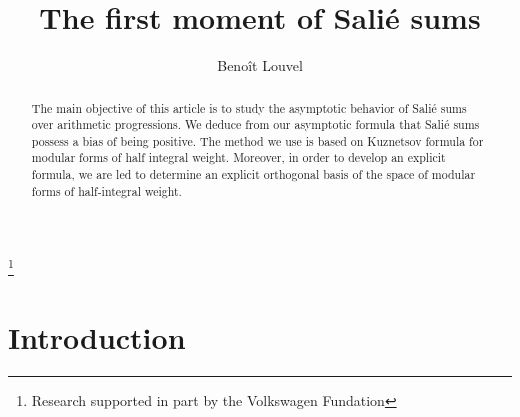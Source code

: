 \documentclass[leqno,10pt]{amsart}
\theoremstyle{plain}
\numberwithin{equation}{section}
\theoremstyle{definition}
\theoremstyle{remark}
\begin{document}
\newcommand{\rond}{\mathcal}
\newcommand{\id}{ \mathfrak}
\newcommand{\einb}{\hookrightarrow} 
\newcommand{\too}{\longrightarrow} 
\newcommand{\pt}{\cdot} 
\newcommand{\pts}{\ldots}
\newcommand{\N}{\mathbb{N}}
\newcommand{\Z}{\mathbb{Z}}
\newcommand{\Q}{\mathbb{Q}}
\newcommand{\R}{\mathbb{R}}
\newcommand{\A}{\mathbb{A}}
\newcommand{\F}{\mathbb{F}}
\newcommand{\C}{\mathbb{C}}
\newcommand{\gras}{\textbf}
\newcommand{\dual}{\land}
\newcommand{\ec}{\textnormal}
\newcommand{\tq}{\vert}
\newcommand{\iso}{\cong}
\newcommand{\tild}{\widetilde}
\newcommand{\congru}{\equiv}
\newcommand{\notcongru}{\not\equiv}
\newcommand{\barre}{\overline }
\newcommand{\norme}{\Vert}
\newcommand{\Mmod}{\ (\bmod\ }%
\newcommand{\mmod}{\ (\!\bmod }%


\title{The first moment of Sali\'e sums}

\author{Beno\^it Louvel}
\address{Mathematisches Institut G\"ottingen \\
Bunsenstr. 3-5 \\ 37073 G\"ottingen}

\thanks{Research supported in part by the Volkswagen Fundation}
\begin{abstract} 
The main objective of this article is to study the asymptotic behavior of Sali\'e sums over arithmetic progressions. We deduce from our asymptotic formula that Sali\'e sums possess a bias of being positive. The method we use is based on Kuznetsov formula for modular forms of half integral weight. Moreover, in order to develop an explicit formula, we are led to determine an explicit orthogonal basis of the space of modular forms of half-integral weight. 
\end{abstract}
\maketitle
\setcounter{page}{1}

\section{Introduction}\label{introduction}
\end{document}

